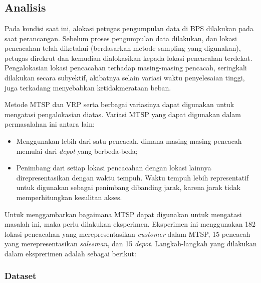 \chapter{\babEmpat}


\section{Analisis}
\label{sec:analysis}
Pada kondisi saat ini, alokasi petugas pengumpulan data di BPS dilakukan pada saat perancangan. Sebelum proses pengumpulan data dilakukan, dan lokasi pencacahan telah diketahui (berdasarkan metode sampling yang digunakan), petugas direkrut dan kemudian dialokasikan kepada lokasi pencacahan terdekat. Pengalokasian lokasi pencacahan terhadap masing-masing pencacah, seringkali dilakukan secara subyektif, akibatnya selain variasi waktu penyelesaian tinggi, juga terkadang menyebabkan ketidakmerataan beban. 


Metode MTSP dan VRP serta berbagai variasinya dapat digunakan untuk mengatasi pengalokasian diatas. Variasi MTSP yang dapat digunakan dalam permasalahan ini antara lain: 

\begin{itemize}
\item Menggunakan lebih dari satu pencacah, dimana masing-masing pencacah memulai dari \textit{depot} yang berbeda-beda;
\item Penimbang dari setiap lokasi pencacahan dengan lokasi lainnya direpresentasikan dengan waktu tempuh. Waktu tempuh lebih representatif untuk digunakan sebagai penimbang dibanding jarak, karena jarak tidak memperhitungkan kesulitan akses.
\end{itemize}


Untuk menggambarkan bagaimana MTSP dapat digunakan untuk mengatasi masalah ini, maka perlu dilakukan eksperimen. Eksperimen ini menggunakan 182 lokasi pencacahan yang merepresentasikan \textit{customer} dalam MTSP, 15 pencacah yang merepresentasikan \textit{salesman}, dan 15 \textit{depot}. Langkah-langkah yang dilakukan dalam eksprerimen adalah sebagai berikut:


\subsection{Dataset}
\label{ssec:mtsp_dataset}
